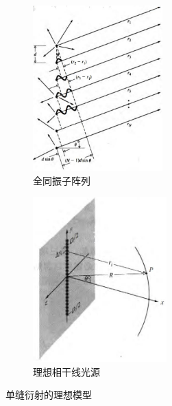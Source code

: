 \documentclass[UTF8]{report}
\theoremstyle{MyLineTheoremStyle} %
\theoremstyle{MyBlockTheoremStyle} %
\theoremstyle{MySubsubsectionStyle} %
\begin{document}
\begin{figure}[H]\centering
\begin{subfigure}[b]{0.5\columnwidth}\centering
    \includegraphics[height=180pt]{assets/4/4.2 全同振子阵列.jpg}
    \caption{全同振子阵列}
\end{subfigure}\hfill
\begin{subfigure}[b]{0.5\columnwidth}\centering
    \includegraphics[height=180pt]{assets/4/4.2 理想相干线光源.jpg}
    \caption{理想相干线光源}
\end{subfigure}
\caption{单缝衍射的理想模型}
\label{单缝衍射的理想模型}
\end{figure}
\end{document}
